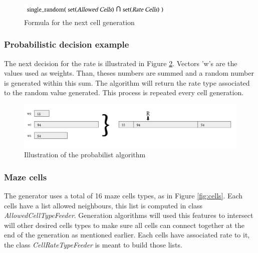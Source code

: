\documentclass[review]{elsarticle}
\begin{document}
\begin{figure}
	\includegraphics[width=75mm]{next_decision_formula.png}
	\centering
	\caption{Formula for the next cell generation}
	\label{fig:next_decision}
\end{figure}

\subsubsection{Probabilistic decision example}
The next decision for the rate is illustrated in Figure \ref{fig:prob_algo}. Vectors 'w's are the values used as weights. Than, theses numbers are summed and a random number is generated within this sum. The algorithm will return the rate type associated to the random value generated. This process is repeated every cell generation.

\begin{figure}
	\includegraphics[width=\linewidth]{prob_algo.png}
	\caption{Illustration of the probabilist algorithm}
	\label{fig:prob_algo}
\end{figure}

\subsubsection{Maze cells}
The generator uses a total of 16 maze cells types, as in Figure \ref{fig:cells}. Each cells have a list allowed neighbours, this list is computed in class \textit{AllowedCellTypeFeeder}. Generation algorithms will used this features to intersect will other desired cells types to make sure all cells can connect together at the end of the generation as mentioned earlier. Each cells have associated rate to it, the class \textit{CellRateTypeFeeder} is meant to build those lists.
\end{document}
